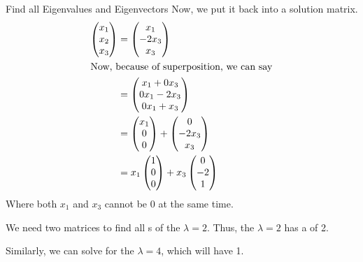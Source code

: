 \begin{example}{Find all Eigenvalues and Eigenvectors}
  Now, we put it back into a solution matrix.
  \begin{align*}
    \begin{pmatrix}
      x_{1} \\
      x_{2} \\
      x_{3}
    \end{pmatrix} &=
                    \begin{pmatrix}
                      x_{1} \\
                      -2x_{3} \\
                      x_{3}
                    \end{pmatrix} \\
    \intertext{Now, because of superposition, we can say}
    &=
      \begin{pmatrix}
        x_{1} + 0x_{3} \\
        0x_{1} - 2x_{3} \\
        0x_{1} + x_{3}
      \end{pmatrix} \\
    &=
      \begin{pmatrix}
        x_{1} \\
        0 \\
        0
      \end{pmatrix} +
    \begin{pmatrix}
      0 \\
      -2x_{3} \\
      x_{3}
    \end{pmatrix} \\
    &= x_{1}
      \begin{pmatrix}
        1 \\
        0 \\
        0 \\
      \end{pmatrix} +
    x_{3}
    \begin{pmatrix}
      0 \\
      -2 \\
      1
    \end{pmatrix}
  \end{align*}
  Where both $x_{1}$ and $x_{3}$ cannot be $0$ at the same time.

  We need two matrices to find all s of the  $\lambda = 2$.
  Thus, the  $\lambda = 2$ has a  of 2.

  Similarly, we can solve for the  $\lambda = 4$, which will have  1.
\end{example}


